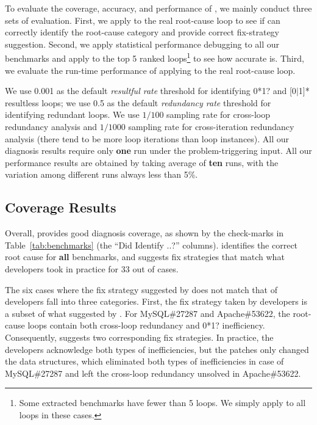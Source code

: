 %

To evaluate the coverage, accuracy, and performance of \Tool, we mainly conduct
three sets of evaluation. First, we apply \Tool to the real root-cause loop to
see if \Tool can correctly identify the root-cause category and provide
correct fix-strategy suggestion. Second, we apply
statistical performance debugging \cite{SongOOPSLA2014} to all our benchmarks
and apply \Tool to the top 5 ranked loops\footnote{Some extracted benchmarks
have fewer than 5 loops. We simply apply \Tool to all loops in these cases.}
to see how accurate \Tool is. Third, we evaluate the run-time performance of
applying \Tool to the real root-cause loop. 
 

We use 0.001 as the default \textit{resultful rate} threshold for identifying
0*1? 
and [0$|$1]* resultless loops; we use 
0.5 as the default \textit{redundancy rate} threshold for identifying redundant loops.
We use $1/100$ sampling rate for cross-loop redundancy analysis and 
$1/1000$ sampling rate for cross-iteration redundancy analysis
(there tend to be more loop iterations than loop instances).
All our diagnosis results require only \textbf{one} run under the 
problem-triggering input.
All our performance results are obtained by taking average of \textbf{ten} runs, 
with the variation among different runs always less than 5\%.


\subsection{Coverage Results}
\label{sec:coverage}
Overall, \Tool provides good diagnosis coverage, as shown by the check-marks in Table~\ref{tab:benchmarks}
(the ``Did \Tool Identify ..?'' columns). 
\Tool identifies the correct root cause for \textbf{all} \allbugs benchmarks, and 
suggests fix strategies that match what developers took in practice
for 33 out of \allbugs cases. 

The six cases where the fix strategy suggested by \Tool does not match that of 
developers fall into three categories.
First, the fix strategy taken by developers is a subset of what suggested by 
\Tool.
For MySQL\#27287 and Apache\#53622, the root-cause loops contain both
cross-loop redundancy and 0*1? inefficiency. Consequently, \Tool suggests two
corresponding fix strategies. In practice, the developers
acknowledge both types of inefficiencies, but the patches
only changed the data structures, which eliminated both types of inefficiencies 
in case of MySQL\#27287 and left the cross-loop redundancy unsolved in
Apache\#53622. 


